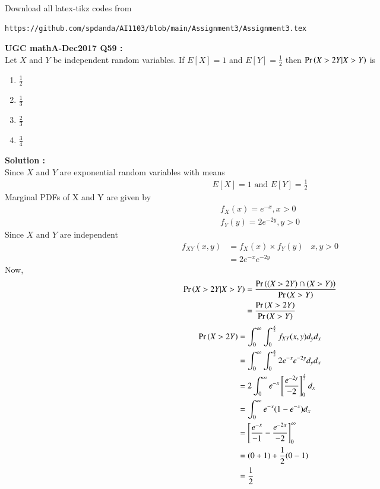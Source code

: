 \documentclass[journal,12pt,twocolumn]{IEEEtran}
\begin{document}
\maketitle
\newpage
\bigskip
\renewcommand{\thefigure}{\theenumi}
\renewcommand{\thetable}{\theenumi}
Download all latex-tikz codes from 
%
\begin{lstlisting}
https://github.com/spdanda/AI1103/blob/main/Assignment3/Assignment3.tex
\end{lstlisting}
\large\textbf{UGC mathA-Dec2017 Q59 :}\\
Let $X$ and $Y$ be independent random variables. If $E[X]=1$ and $E[Y]=\frac{1}{2}$ then $\Pr\left(X>2Y|X>Y\right)$ is
\begin{multicols}{2}
    \begin{enumerate}[label=\arabic*.]
        \item \Large$\frac{1}{2}$ \\
        \item $\frac{1}{3}$
        \item $\frac{2}{3}$ \\
        \item $\frac{3}{4}$
    \end{enumerate}
\end{multicols}
\textbf{Solution :}\\
Since $X$ and $Y$ are exponential random variables with means
\begin{align}
    E[X] = 1 \text{ and }
    E[Y] = \frac{1}{2}
\end{align}
Marginal PDFs of X and Y are given by
\begin{align}
    f_X(x)= e^{-x} , x>0 \\
    f_Y(y) = 2e^{-2y} , y>0
\end{align}
Since $X$ and $Y$ are independent
\begin{align}
    f_{XY}(x,y) &= f_X(x)\times f_Y(y) \;\;\;x,y >0 \\
                &= 2e^{-x}e^{-2y}
\end{align}
Now,
\begin{align}
    \Pr\left(X>2Y|X>Y\right) &= \dfrac{\Pr\left((X>2Y) \cap (X>Y)\right) }{\Pr\left(X>Y\right)}\\
                  &= \dfrac{\Pr\left(X>2Y\right)}{\Pr\left(X>Y\right)} \label{simul1}
\end{align}
\begin{align}
    \Pr\left(X>2Y\right) &= \int_{0}^{\infty}\int_{0}^{\frac{x}{2}} f_{XY}(x,y) d_yd_x \\
              &= \int_{0}^{\infty}\int_{0}^{\frac{x}{2}} 2e^{-x}e^{-2y}d_yd_x \\
              &= 2\int_{0}^{\infty} e^{-x} \left[\frac{e^{-2y}}{-2}\right]_0^{\frac{x}{2}}d_x\\
              &= \int_{0}^{\infty} e^{-x}(1-e^{-x})d_x\\
              &= \left[\frac{e^{-x}}{-1} - \frac{e^{-2x}}{-2}\right]_0^\infty\\
              &= (0+1) + \frac{1}{2}(0-1)\\
              &= \frac{1}{2} \label{simul2}
\end{align}
\end{document}
